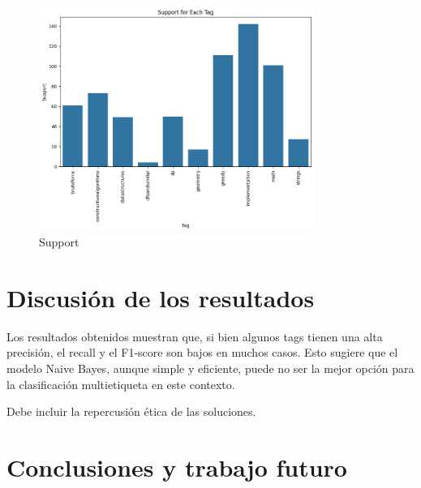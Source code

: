\documentclass{article}
\begin{document}
\begin{figure}[H]
    \centering
    \includegraphics[width=0.8\textwidth]{imgs/supportnb.png}
    \caption{Support}
    \label{fig:s}
\end{figure}

\section{Discusión de los resultados}
Los resultados obtenidos muestran que, si bien algunos tags tienen una alta precisión, el recall y el F1-score son bajos en muchos casos. Esto sugiere que el modelo Naive Bayes, aunque simple y eficiente, puede no ser la mejor opción para la clasificación multietiqueta en este contexto.


Debe incluir la repercusión ética de las soluciones.

\section{Conclusiones y trabajo futuro}
\end{document}
